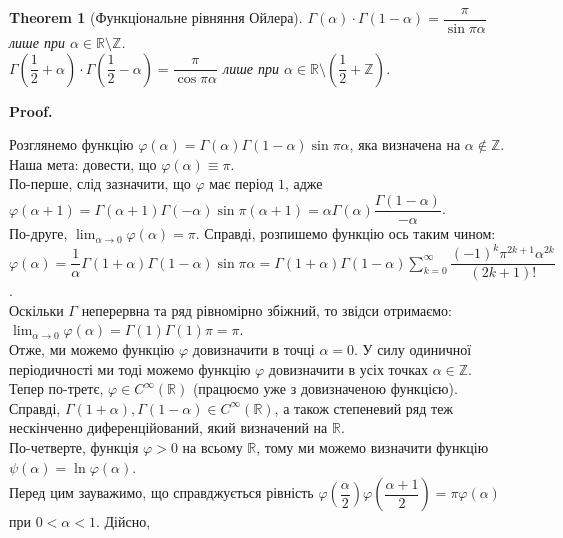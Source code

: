 \documentclass[a4paper, 10pt]{article}
\makeatletter
\theoremstyle{theoremdd}
\newtheorem{theorem}{Theorem}[subsection]
\theoremstyle{theoremdd}
\theoremstyle{theoremdd}
\theoremstyle{theoremdd}
\theoremstyle{theoremdd}
\theoremstyle{theoremdd}
\theoremstyle{theoremdd}
\theoremstyle{theoremdd}
\theoremstyle{theoremdd}
\renewenvironment{proof}[1][Proof.\\]{\par
\pushQED{\hfill \qed}%
\normalfont \topsep6\p@\@plus6\p@\relax
\trivlist
\item\relax
{\bfseries
#1\@addpunct{.}}\hspace\labelsep\ignorespaces
}{%
\popQED\endtrivlist\@endpefalse
}
\makeatother
\begin{document}
\begin{theorem}[Функціональне рівняння Ойлера]
$\Gamma(\alpha) \cdot \Gamma(1-\alpha) = \dfrac{\pi}{\sin \pi \alpha}$ лише при $\alpha \in \mathbb{R} \setminus \mathbb{Z}$.\\
$\Gamma \left(\dfrac{1}{2} + \alpha \right) \cdot \Gamma \left(\dfrac{1}{2}-\alpha \right) = \dfrac{\pi}{\cos \pi \alpha}$ лише при $\alpha \in \mathbb{R} \setminus \left( \dfrac{1}{2}  + \mathbb{Z} \right)$.
\end{theorem}

\begin{proof}
Розглянемо функцію $\varphi(\alpha) = \Gamma(\alpha) \Gamma(1-\alpha) \sin \pi \alpha$, яка визначена на $\alpha \notin \mathbb{Z}$. Наша мета: довести, що $\varphi(\alpha) \equiv \pi$.\\
По-перше, слід зазначити, що $\varphi$ має період $1$, адже\\
$\varphi(\alpha+1) = \Gamma(\alpha+1)\Gamma(-\alpha) \sin \pi(\alpha+1) = \alpha \Gamma(\alpha) \dfrac{\Gamma(1-\alpha)}{-\alpha}$.\\
По-друге, $\displaystyle\lim_{\alpha \to 0} \varphi(\alpha) = \pi$. Справді, розпишемо функцію ось таким чином:\\
$\displaystyle\varphi(\alpha) = \dfrac{1}{\alpha} \Gamma(1+\alpha) \Gamma(1-\alpha) \sin \pi \alpha = \Gamma(1+\alpha) \Gamma(1-\alpha) \sum_{k=0}^\infty \dfrac{(-1)^k\pi^{2k+1} \alpha^{2k}}{(2k+1)!}$.\\
Оскільки $\Gamma$ неперервна та ряд рівномірно збіжний, то звідси отримаємо:\\
$\displaystyle\lim_{\alpha \to 0} \varphi(\alpha) = \Gamma(1) \Gamma(1) \pi = \pi$.\\
Отже, ми можемо функцію $\varphi$ довизначити в точці $\alpha = 0$. У силу одиничної періодичності ми тоді можемо функцію $\varphi$ довизначити в усіх точках $\alpha \in \mathbb{Z}$.\\
Тепер по-третє, $\varphi \in C^{\infty}(\mathbb{R})$ (працюємо уже з довизначеною функцією). Справді, $\Gamma(1+\alpha), \Gamma(1-\alpha) \in C^{\infty}(\mathbb{R})$, а також степеневий ряд теж нескінченно диференційований, який визначений на $\mathbb{R}$.\\
По-четверте, функція $\varphi > 0$ на всьому $\mathbb{R}$, тому ми можемо визначити функцію $\psi(\alpha) = \ln \varphi(\alpha)$.\\
Перед цим зауважимо, що справджується рівність $\varphi\left( \dfrac{\alpha}{2} \right) \varphi\left( \dfrac{\alpha+1}{2}\right) = \pi \varphi(\alpha)$ при $0 < \alpha < 1$. Дійсно,\\

\end{proof}
\end{document}
